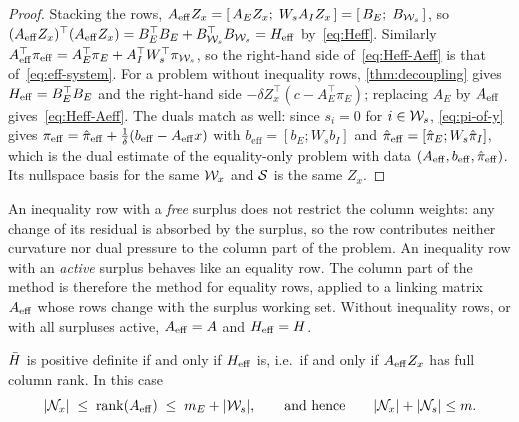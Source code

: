 \begin{proof}
Stacking the rows, $A_{\mathrm{eff}} Z_x = [\,A_EZ_x;\; W_sA_IZ_x\,] = [\,B_E;\; B_{\mathcal{W}_s}\,]$, so
$(A_{\mathrm{eff}} Z_x)^\top(A_{\mathrm{eff}} Z_x) = B_E^\top B_E + B_{\mathcal{W}_s}^\top B_{\mathcal{W}_s} = H_{\mathrm{eff}}$ by~\eqref{eq:Heff}.
Similarly $A_{\mathrm{eff}}^\top\pi_{\mathrm{eff}} = A_E^\top\pi_E + A_I^\top W_s^\top\pi_{\mathcal{W}_s}$, so the right-hand side
of~\eqref{eq:Heff-Aeff} is that of~\eqref{eq:eff-system}. For a problem without inequality rows,
\cref{thm:decoupling} gives $H_{\mathrm{eff}} = B_E^\top B_E$ and the right-hand side
$-\delta Z_x^\top(c - A_E^\top\pi_E)$; replacing $A_E$ by $A_{\mathrm{eff}}$ gives~\eqref{eq:Heff-Aeff}.
The duals match as well: since $s_i = 0$ for $i\in\mathcal{W}_s$, \eqref{eq:pi-of-y} gives
$\pi_{\mathrm{eff}} = \hat{\pi}_{\mathrm{eff}} + \frac{1}{\delta}(b_{\mathrm{eff}} - A_{\mathrm{eff}} x)$ with
$b_{\mathrm{eff}} = [b_E; W_sb_I]$ and $\hat{\pi}_{\mathrm{eff}} = [\hat{\pi}_E; W_s\hat{\pi}_I]$, which is the
dual estimate of the equality-only problem with data $(A_{\mathrm{eff}}, b_{\mathrm{eff}}, \hat{\pi}_{\mathrm{eff}})$.
Its nullspace basis for the same $\mathcal{W}_x$ and $\mathcal{S}$ is the same $Z_x$.
\end{proof}

\begin{remark}[Interpretation] \label{rem:Aeff-interpretation}
An inequality row with a \emph{free} surplus does not restrict the column weights: any
change of its residual is absorbed by the surplus, so the row contributes neither curvature
nor dual pressure to the column part of the problem. An inequality row with an \emph{active}
surplus behaves like an equality row. The column part of the method is therefore the
method for equality rows, applied to a linking matrix $A_{\mathrm{eff}}$ whose rows change with the
surplus working set. Without inequality rows, or with all surpluses active, $A_{\mathrm{eff}} = A$ and
$H_{\mathrm{eff}} = H$.
\end{remark}

\begin{cor} \label{cor:dimension}
$\bar{H}$ is positive definite if and only if $H_{\mathrm{eff}}$ is, i.e.\ if and only if $A_{\mathrm{eff}} Z_x$ has
full column rank. In this case
\[
|\mathcal{N}_x|\;\le\;\operatorname{rank}(A_{\mathrm{eff}})\;\le\;m_E + |\mathcal{W}_s|,\qquad\text{and hence}\qquad |\mathcal{N}_x| + |\mathcal{N}_s|\le m .
\]
\end{cor}

